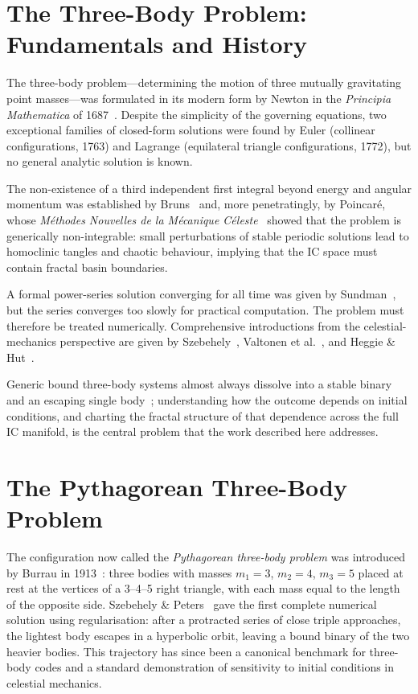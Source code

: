\documentclass[11pt,a4paper]{article}
\begin{document}
\section{The Three-Body Problem: Fundamentals and History}

The three-body problem---determining the motion of three mutually gravitating point masses---was
formulated in its modern form by Newton in the \emph{Principia Mathematica} of
1687~\cite{newton1687}.  Despite the simplicity of the governing equations, two exceptional
families of closed-form solutions were found by Euler (collinear configurations, 1763) and
Lagrange (equilateral triangle configurations, 1772), but no general analytic solution is known.

The non-existence of a third independent first integral beyond energy and angular momentum was
established by Bruns~\cite{bruns1887} and, more penetratingly, by Poincar\'{e}, whose
\emph{M\'{e}thodes Nouvelles de la M\'{e}canique C\'{e}leste}~\cite{poincare1892} showed that
the problem is generically non-integrable: small perturbations of stable periodic solutions lead
to homoclinic tangles and chaotic behaviour, implying that the IC space must contain fractal
basin boundaries.

A formal power-series solution converging for all time was given by Sundman~\cite{sundman1912},
but the series converges too slowly for practical computation.  The problem must therefore be
treated numerically.  Comprehensive introductions from the celestial-mechanics perspective are
given by Szebehely~\cite{szebehely1967book}, Valtonen et al.~\cite{valtonen2016}, and Heggie
\& Hut~\cite{heggie2003}.

Generic bound three-body systems almost always dissolve into a stable binary and an escaping
single body~\cite{heggie2003}; understanding how the outcome depends on initial conditions, and
charting the fractal structure of that dependence across the full IC manifold, is the central
problem that the work described here addresses.

\section{The Pythagorean Three-Body Problem}

The configuration now called the \emph{Pythagorean three-body problem} was introduced by
Burrau in 1913~\cite{burrau1913}: three bodies with masses $m_1=3$, $m_2=4$, $m_3=5$ placed
at rest at the vertices of a 3--4--5 right triangle, with each mass equal to the length of the
opposite side.  Szebehely \& Peters~\cite{szebehely1967} gave the first complete numerical
solution using regularisation: after a protracted series of close triple approaches, the
lightest body escapes in a hyperbolic orbit, leaving a bound binary of the two heavier bodies.
This trajectory has since been a canonical benchmark for three-body codes and a standard
demonstration of sensitivity to initial conditions in celestial mechanics.
\end{document}
